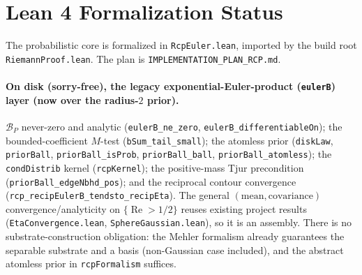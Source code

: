 \documentclass[11pt,a4paper]{article}
\theoremstyle{definition}
\newcommand{\Rea}{\operatorname{Re}}
\begin{document}
\section{Lean 4 Formalization Status}\label{sec:status}

The probabilistic core is formalized in \texttt{RcpEuler.lean}, imported by the build root
\texttt{RiemannProof.lean}. The plan is \texttt{IMPLEMENTATION\_PLAN\_RCP.md}.

\paragraph{On disk (sorry-free), the legacy exponential-Euler-product (\texttt{eulerB}) layer
(now over the radius-\(2\) prior).}
\(\mathcal{B}_P\) never-zero and analytic (\texttt{eulerB\_ne\_zero},
\texttt{eulerB\_differentiableOn}); the bounded-coefficient \(M\)-test
(\texttt{bSum\_tail\_small}); the atomless prior (\texttt{diskLaw}, \texttt{priorBall},
\texttt{priorBall\_isProb}, \texttt{priorBall\_ball}, \texttt{priorBall\_atomless}); the
\texttt{condDistrib} kernel (\texttt{rcpKernel}); the positive-mass Tjur precondition
(\texttt{priorBall\_edgeNbhd\_pos}); and the reciprocal contour convergence
(\texttt{rcp\_recipEulerB\_tendsto\_recipEta}). The general
\((\text{mean},\text{covariance})\) convergence/analyticity on \(\{\Rea>1/2\}\) reuses
existing project results (\texttt{EtaConvergence.lean}, \texttt{SphereGaussian.lean}), so it
is an assembly. There is no substrate-construction obligation: the Mehler formalism already
guarantees the separable substrate and a basis (non-Gaussian case included), and the
abstract atomless prior in \texttt{rcpFormalism} suffices.
\end{document}

